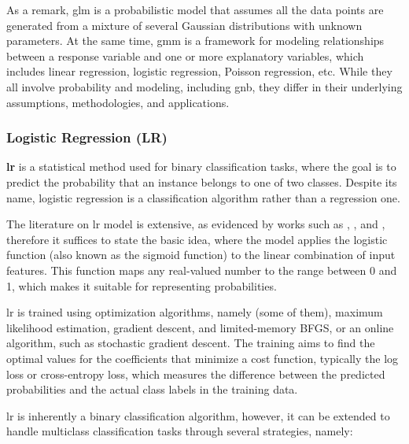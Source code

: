 As a remark, \gls{glm} is a probabilistic model that assumes all the data points are generated from a mixture of several Gaussian distributions with unknown parameters. At the same time,  \gls{gmm} is a framework for modeling relationships between a response variable and one or more explanatory variables, which includes linear regression, logistic regression, Poisson regression, etc. While they all involve probability and modeling, including \gls{gnb}, they differ in their underlying assumptions, methodologies, and applications.


\subsubsection{Logistic Regression (LR)}
\label{subsubsec:machine_learning_logistic_regrassion}

\textbf{\gls{lr}} is a statistical method used for binary classification tasks, where the goal is to predict the probability that an instance belongs to one of two classes. Despite its name, logistic regression is a classification algorithm rather than a regression one.

The literature on \gls{lr} model is extensive, as evidenced by works such as \cite{Mitchell1997}, \cite{Bouguila2020}, and \cite{Russel2010}, therefore it suffices to state the basic idea, where the model applies the logistic function (also known as the sigmoid function) to the linear combination of input features. This function maps any real-valued number to the range between 0 and 1, which makes it suitable for representing probabilities.

\gls{lr} is trained using optimization algorithms, namely (some of them), maximum likelihood estimation, gradient descent, and limited-memory BFGS, or an online algorithm, such as stochastic gradient descent. The training aims to find the optimal values for the coefficients that minimize a cost function, typically the log loss or cross-entropy loss, which measures the difference between the predicted probabilities and the actual class labels in the training data.

\gls{lr} is inherently a binary classification algorithm, however, it can be extended to handle multiclass classification tasks through several strategies, namely:

